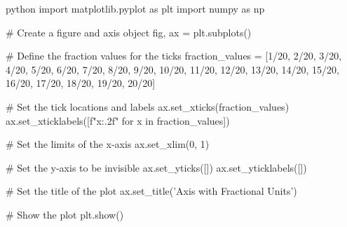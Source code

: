 python
import matplotlib.pyplot as plt
import numpy as np

# Create a figure and axis object
fig, ax = plt.subplots()

# Define the fraction values for the ticks
fraction_values = [1/20, 2/20, 3/20, 4/20, 5/20, 6/20, 7/20, 8/20, 9/20, 10/20,
                   11/20, 12/20, 13/20, 14/20, 15/20, 16/20, 17/20, 18/20, 19/20, 20/20]

# Set the tick locations and labels
ax.set_xticks(fraction_values)
ax.set_xticklabels([f"{x:.2f}" for x in fraction_values])

# Set the limits of the x-axis
ax.set_xlim(0, 1)

# Set the y-axis to be invisible
ax.set_yticks([])
ax.set_yticklabels([])

# Set the title of the plot
ax.set_title('Axis with Fractional Units')

# Show the plot
plt.show()